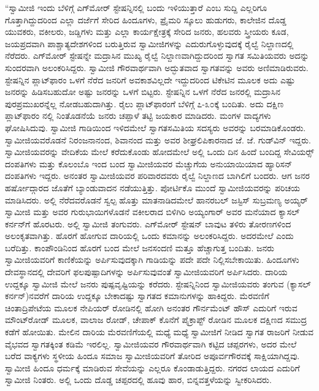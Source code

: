  “ಸ್ವಾಮೀಜಿ ಇಂದು ಬೆಳಿಗ್ಗೆ ಎಗ್‍ಮೋರ್ ಸ್ಟೇಷನ್ನಿನಲ್ಲಿ ಬಂದು ಇಳಿಯುತ್ತಾರೆ ಎಂಬ ಸುದ್ದಿ ಎಲ್ಲರಿಗೂ ಗೊತ್ತಾಗಿದ್ದುದರಿಂದ ಎಲ್ಲಾ ದರ್ಜೆಗೆ ಸೇರಿದ ಹಿಂದೂಗಳು, ಪ್ರೈಮರಿ ಸ್ಕೂಲು ಹುಡುಗರು, ಕಾಲೇಜಿನ ದೊಡ್ಡ ಯುವಕರು, ವಕೀಲರು, ಜಡ್ಡಿಗಳು ಮತ್ತು ಎಲ್ಲಾ ಕಾರ್ಯಕ್ಷೇತ್ರಕ್ಕೆ ಸೇರಿದ ಜನರು, ಹಲವರು ಸ್ತ್ರೀಯರು ಕೂಡ, ಜಯಪ್ರದವಾಗಿ ಪಾಶ್ಚಾತ್ಯದೇಶಗಳಿಂದ ಬರುತ್ತಿರುವ ಸ್ವಾಮೀಜಿಗಳನ್ನು ಎದುರುಗೊಳ್ಳುವುದಕ್ಕೆ ರೈಲ್ವೆ ನಿಲ್ದಾಣದಲ್ಲಿ ನೆರೆದರು. ಎಗ್‍ಮೋರ್ ಸ್ಟೇಷನ್ನೇ ಮದ್ರಾಸಿನ ಮುಖ್ಯ ರೈಲ್ವೆ ನಿಲ್ದಾಣವಾಗಿದ್ದುದರಿಂದ ಸ್ವಾಗತ ಸಮಿತಿಯವರು ಅದನ್ನು ಸುಂದರವಾಗಿ ಅಲಂಕರಿಸಿದ್ದರು. ಸ್ವಾಮೀಜಿ ಗೌರವಾರ್ಥವಾಗಿ ಅದ್ಭುತವಾದ ಸ್ವಾಗತವನ್ನು ಅವರು ಅಣಿಮಾಡಿರುವರು. ಸ್ಟೇಷನ್ನಿನ ಪ್ಲಾಟ್‍ಫಾರಂ ಒಳಗೆ ನೆರೆದ ಜನರಿಗೆ ಅವಕಾಶವಿಲ್ಲದೇ ಇದ್ದುದರಿಂದ ಟಿಕೇಟಿನ ಮೂಲಕ ಅದು ಎಷ್ಟು ಜನರನ್ನು ಹಿಡಿಸಬಹುದೋ ಅಷ್ಟು ಜನರನ್ನು ಒಳಗೆ ಬಿಟ್ಟರು. ಸ್ಟೇಷನ್ನಿನ ಒಳಗೆ ನೆರೆದ ಜನರಲ್ಲಿ ಮದ್ರಾಸಿನ ಪುರಪ್ರಮುಖರನ್ನೆಲ್ಲ ನೋಡಬಹುದಾಗಿತ್ತು. ರೈಲು ಪ್ಲಾಟ್‍ಫಾರಂಗೆ ಬೆಳಿಗ್ಗೆ ೭-೩೦ಕ್ಕೆ ಬಂದಿತು. ಅದು ದಕ್ಷಿಣ ಪ್ಲಾಟ್‍ಫಾರಂ ನಲ್ಲಿ ನಿಂತೊಡನೆಯೆ ಜನರು ಚಪ್ಪಾಳೆ ತಟ್ಟಿ ಜಯಕಾರ ಮಾಡಿದರು. ಮಂಗಳ ವಾದ್ಯಗಳು ಘೋಷಿಸಿದುವು. ಸ್ವಾಮೀಜಿ ಗಾಡಿಯಿಂದ ಇಳಿದಮೇಲೆ ಸ್ವಾಗತಸಮಿತಿಯ ಸದಸ್ಯರು ಅವರನ್ನು ಬರಮಾಡಿಕೊಂಡರು. ಸ್ವಾಮೀಜಿಯವರೊಡನೆ ನಿರಂಜನಾನಂದ, ಶಿವಾನಂದ ಮತ್ತು ಅವರ ಶೀಘ್ರಲಿಪಿಕಾರನಾದ ಜೆ. ಜೆ. ಗುಡ್‍ವಿನ್ ಇದ್ದರು. ಸ್ವಾಮೀಜಿಯವರನ್ನು ವೇದಿಕೆಯ ಮೇಲೆ ಕರೆದುಕೊಂಡು ಹೋದಮೇಲೆ ಅಲ್ಲಿ ಒಂದು ದಿನ ಹಿಂದೆ ಬಂದಿದ್ದ ಸೇವಿಯರ್ಸ್‍‍ ದಂಪತಿಗಳು ಮತ್ತು ಕೊಲಂಬೊ ಇಂದ ಬಂದ ಸ್ವಾಮೀಜಿಯವರ ಮೆಚ್ಚುಗೆಯ ಅನುಯಾಯಿಯಾದ ಹ್ಯಾರಿಸನ್ ದಂಪತಿಗಳು ಇದ್ದರು. ಅನಂತರ ಸ್ವಾಮೀಜಿಯವರ ಪರಿವಾರದವರು ರೈಲ್ವೆ ನಿಲ್ದಾಣದ ಬಾಗಿಲಿಗೆ ಬಂದರು. ಆಗ ಜನರ ಹರ್ಷೋದ್ಗಾರದ ಜೊತೆಗೆ ಬ್ಯಾಂಡುವಾದನ ನಡೆಯುತ್ತಿತ್ತು. ಪೋರ್ಟಿಕೊ ಮುಂದೆ ಸ್ವಾಮೀಜಿಯವರನ್ನು ಪರಿಚಯ ಮಾಡಿಸಿದರು. ಅಲ್ಲಿ ನೆರೆದವರೊಡನೆ ಸ್ವಲ್ಪ ಹೊತ್ತು ಮಾತನಾಡಿದಮೇಲೆ ಹಾನರಬಲ್ ಜಸ್ಟಿಸ್ ಸುಬ್ರಮಣ್ಯ ಅಯ್ಯರ್ ಸ್ವಾಮೀಜಿ ಮತ್ತು ಅವರ ಗುರುಭಾಯಿಗಳೊಡನೆ ವಕೀಲರಾದ ಬಿಳಿಗಿರಿ ಅಯ್ಯಂಗಾರ್ ಅವರ ಮನೆಯಾದ ಕ್ಯಾಸಲ್ ಕರ್ನನ್‍ಗೆ ಹೊರಟರು. ಅಲ್ಲಿ ಸ್ವಾಮೀಜಿ ತಂಗುವರು. ಎಗ್‍ಮೋರ್ ಸ್ಟೇಷನ್ ಬಾವುಟ ತಳಿರು ತೋರಣಗಳಿಂದ ಅಲಂಕೃತವಾಗಿತ್ತು. ಹೊರಗೆ ಹೋಗುವ ದಾರಿಯಲ್ಲಿ ಒಂದು ಕಮಾನನ್ನು ಅಲಂಕರಿಸಿದ್ದರು. ಅದರಮೇಲೆ  ಎಂದು ಬರೆದಿತ್ತು. ಕಾಂಪೌಂಡಿನಿಂದ ಹೊರಗೆ ಬಂದ ಮೇಲೆ ಜನಸಂದಣಿ ಮತ್ತೂ ಹೆಚ್ಚಾಗುತ್ತ ಬಂದಿತು. ಜನರು ಸ್ವಾಮೀಜಿಯವರಿಗೆ ಕಾಣಿಕೆಯನ್ನು ಅರ್ಪಿಸುವುದಕ್ಕಾಗಿ ಗಾಡಿಯನ್ನು ಪದೇ ಪದೇ ನಿಲ್ಲಿಸಬೇಕಾಯಿತು. ಹಿಂದೂಗಳು ದೇವಸ್ಥಾನದಲ್ಲಿ ದೇವರಿಗೆ ಫಲಪುಷ್ಪಾದಿಗಳನ್ನು ಅರ್ಪಿಸುವುವಂತೆ ಸ್ವಾಮೀಜಿಯವರಿಗೆ ಅರ್ಪಿಸಿದರು. ದಾರಿಯ ಉದ್ದಕ್ಕೂ ಸ್ವಾಮೀಜಿ ಮೇಲೆ ಜನರು ಪುಷ್ಪವೃಷ್ಟಿಯನ್ನು ಕರೆದರು. ಸ್ಟೇಷನ್ನಿನಿಂದ ಸ್ವಾಮೀಜಿಯವರು ತಂಗುವ  (ಕ್ಯಾಸಲ್ ಕರ್ನನ್)‌ನವರೆಗೆ ದಾರಿಯ ಉದ್ದಕ್ಕೂ ಬೇಕಾದಷ್ಟು ಸ್ವಾಗತದ ಕಮಾನುಗಳನ್ನು ಹಾಕಿದ್ದರು. ಮೆರವಣಿಗೆ ಚಿಂತಾದ್ರಿಪೇಟೆಯ ಮೂಲಕ ನೇಪಿಯರ್ ರೋಡಿನಲ್ಲಿ ಹೋಗಿ ಅನಂತರ ಗೌರ್ನಮೆಂಟ್ ಹೌಸ್ ಎದುರಿಗೆ ಇರುವ ಮೌಂಟ್‍ರೋಡ್ ಮೂಲಕ, ವಾಲಾಜ ರೋಡ್, ಚೇಪಾಕ್ ಕೊನೆಗೆ ಪೈಕ್ರಾಪ್ಟ್ ರೋಡಿನ ಮೂಲಕ ದಕ್ಷಿಣದ ಸಮುದ್ರ ಕಡೆಗೆ ಹೋಯಿತು. ಮೇಲಿನ ದಾರಿಯ ಮೆರವಣಿಗೆಯಲ್ಲಿ ಮಧ್ಯೆ ಮಧ್ಯೆ ಸ್ವಾಮೀಜಿಗೆ ನೀಡಿದ ಸ್ವಾಗತ ರಾಜರಿಗೆ ನೀಡುವ ವೈಭವದ ಸ್ವಾಗತಕ್ಕಿಂತ ಕಡಿಮೆ ಇರಲಿಲ್ಲ. ಸ್ವಾಮೀಜಿಯವರ ಗೌರವಾರ್ಥವಾಗಿ ಕಟ್ಟಿದ ಚಪ್ಪರಗಳು, ಅದರ ಮೇಲೆ ಬರೆದ ವಾಕ್ಯಗಳು ಸ್ಥಳೀಯ ಹಿಂದೂ ಸಮಾಜ ಸ್ವಾಮೀಜಿಯವರಿಗೆ ತೋರಿದ ಅಪೂರ್ವಗೌರವಕ್ಕೆ ಸಾಕ್ಷಿಯಾಗಿದ್ದವು. ಸ್ವಾಮೀಜಿ ಹಿಂದೂ ಧರ್ಮಕ್ಕೆ ಮಾಡಿರುವ ಸೇವೆಯನ್ನು ಎಲ್ಲರೂ ಕೊಂಡಾಡುತ್ತಿದ್ದರು. ನಗರದ ಲಾಯದ ಎದುರಿಗೆ ಸ್ವಾಮೀಜಿ ನಿಂತರು. ಅಲ್ಲಿ ಒಂದು ದೊಡ್ಡ ಚಪ್ಪರದಲ್ಲಿ ಹೂವು ಹಾರ, ಬಿನ್ನವತ್ತಳೆಯನ್ನು ಸ್ವೀಕರಿಸಿದರು. 

